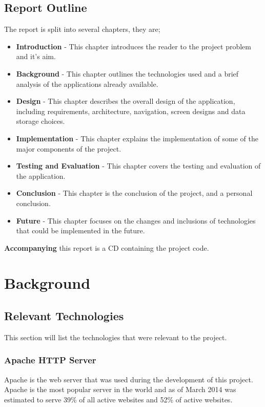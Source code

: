 \documentclass[a4paper, 12pt]{report}
\begin{document}
\section{Report Outline}
The report is split into several chapters, they are;
\begin{itemize}
\item \textbf{Introduction} - This chapter introduces the reader to the project problem and it's aim. 
\item \textbf{Background} - This chapter outlines the technologies used and a brief analysis of the applications already available.
\item \textbf{Design} - This chapter describes the overall design of the application, including requirements, architecture, navigation, screen designs and data storage choices.
\item \textbf{Implementation} - This chapter explains the implementation of some of the major components of the project.
\item \textbf{Testing and Evaluation} - This chapter covers the testing and evaluation of the application.
\item \textbf{Conclusion} - This chapter is the conclusion of the project, and a personal conclusion.
\item \textbf{Future} - This chapter focuses on the changes and inclusions of technologies that could be implemented in the future.
\end{itemize}
\textbf{Accompanying} this report is a CD containing the project code.


\clearpage
\chapter{Background}

\section{Relevant Technologies}
This section will list the technologies that were relevant to the project.

\subsection{Apache HTTP Server}
Apache is the web server that was used during the development of this project. Apache is the most popular server in the world and as of March 2014 was estimated to serve 39\% of all active websites and 52\% of active websites\cite{apache}.
\end{document}

